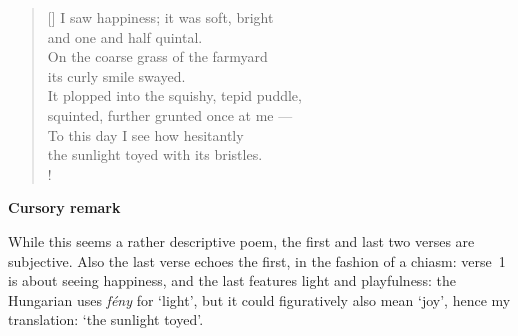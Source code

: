 \documentclass[a4paper,12pt,twoside,final]{book}
\begin{document}
\newpage


\settowidth{\versewidth}{It plopped into the squishy, tepid puddle,}

\begin{verse}[\versewidth]
  I saw happiness; it was soft, bright \\
  and one and half quintal. \\
  On the coarse grass of the farmyard \\
  its curly smile swayed. \\
  It plopped into the squishy, tepid puddle, \\
  squinted, further grunted once at me --- \\
  To this day I see how hesitantly \\
  the sunlight toyed with its bristles. \\!
\end{verse}


\bigskip

\noindent \textbf{Cursory remark}

\medskip

While this seems a rather descriptive poem, the first and last two
verses are subjective. Also the last verse echoes the first, in the
fashion of a chiasm: verse~1 is about seeing happiness, and the last
features light and playfulness: the Hungarian uses \emph{fény} for
`light', but it could figuratively also mean `joy', hence my
translation: `the sunlight toyed'.

\newpage

\settowidth{\versewidth}{hunyorgott, röffent még felém ---}
\end{document}
